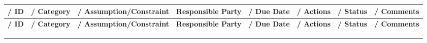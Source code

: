 \documentclass[10pt,letterpaper]{article}
\renewcommand\arraystretch{1.25}
\begin{document}
\begin{landscape}
\begin{center}
\begingroup
\setlength\tabcolsep{2.0pt}
\scriptsize
\renewcommand\arraystretch{1.55}
\begin{longtable}{|>{\raggedright\arraybackslash}p{1.026in}|>{\raggedright\arraybackslash}p{1.026in}|>{\raggedright\arraybackslash}p{1.026in}|>{\raggedright\arraybackslash}p{1.026in}|>{\raggedright\arraybackslash}p{1.026in}|>{\raggedright\arraybackslash}p{1.026in}|>{\raggedright\arraybackslash}p{1.026in}|>{\raggedright\arraybackslash}p{1.026in}|}
\hline
\rowcolor{light}
\textbf{/ ID} & \textbf{/ Category} & \textbf{/ Assumption/Constraint} & \textbf{Responsible Party} & \textbf{/ Due Date} & \textbf{/ Actions} & \textbf{/ Status} & \textbf{/ Comments} \\ \hline
\endfirsthead
\hline\rowcolor{light} \textbf{/ ID} & \textbf{/ Category} & \textbf{/ Assumption/Constraint} & \textbf{Responsible Party} & \textbf{/ Due Date} & \textbf{/ Actions} & \textbf{/ Status} & \textbf{/ Comments} \\ \hline
\endhead
\rule{0pt}{11pt}\hspace{0pt} & \rule{0pt}{11pt}\hspace{0pt} & \rule{0pt}{11pt}\hspace{0pt} & \rule{0pt}{11pt}\hspace{0pt} & \rule{0pt}{11pt}\hspace{0pt} & \rule{0pt}{11pt}\hspace{0pt} & \rule{0pt}{11pt}\hspace{0pt} & \rule{0pt}{11pt}\hspace{0pt} \\ \hline
\rule{0pt}{11pt}\hspace{0pt} & \rule{0pt}{11pt}\hspace{0pt} & \rule{0pt}{11pt}\hspace{0pt} & \rule{0pt}{11pt}\hspace{0pt} & \rule{0pt}{11pt}\hspace{0pt} & \rule{0pt}{11pt}\hspace{0pt} & \rule{0pt}{11pt}\hspace{0pt} & \rule{0pt}{11pt}\hspace{0pt} \\ \hline
\rule{0pt}{11pt}\hspace{0pt} & \rule{0pt}{11pt}\hspace{0pt} & \rule{0pt}{11pt}\hspace{0pt} & \rule{0pt}{11pt}\hspace{0pt} & \rule{0pt}{11pt}\hspace{0pt} & \rule{0pt}{11pt}\hspace{0pt} & \rule{0pt}{11pt}\hspace{0pt} & \rule{0pt}{11pt}\hspace{0pt} \\ \hline

\end{longtable}
\end{center}
\end{landscape}
\end{document}
